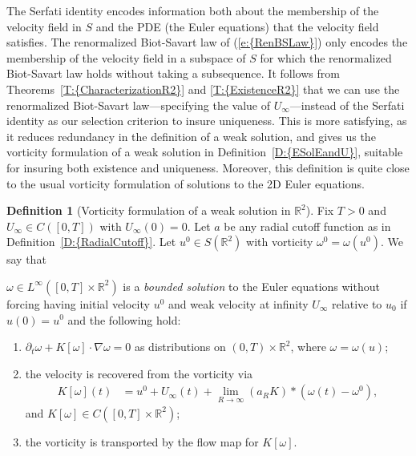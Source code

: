 \documentclass[reqno,openright,11pt,twoside]{amsart}
\theoremstyle{definition}
\newtheorem{definition}[theorem]{Definition}
\numberwithin{equation}{section}
\begin{document}
The Serfati identity encodes information both about the membership of the velocity field in $S$ and the PDE (the Euler equations) that the velocity field satisfies. The renormalized Biot-Savart law of {(\ref{e:{RenBSLaw}})} only encodes the membership of the velocity field in a subspace of $S$ for which the renormalized Biot-Savart law holds without taking a subsequence. It follows from {Theorems~\ref{T:{CharacterizationR2}} and \ref{T:{ExistenceR2}}} that we can use the renormalized Biot-Savart law---specifying the value of $U_{\ensuremath{\infty}}$---instead of the Serfati identity as our selection criterion to insure uniqueness. This is more satisfying, as it reduces redundancy in the definition of a weak solution, and gives us the vorticity formulation of a weak solution in {Definition~\ref{D:{ESolEandU}}}, suitable for insuring both existence and uniqueness. Moreover, this definition is quite close to the usual vorticity formulation of solutions to the 2D Euler equations.

\begin{definition}[Vorticity formulation of a weak solution in ${\ensuremath{{\ensuremath{\mathbb{{R}}}}}}^2$]\label{D:ESolEandU}
    Fix $T > 0$ and $U_{\ensuremath{\infty}} \in C([0, T])$ with $U_{\ensuremath{\infty}}(0) = 0$.
    Let $a$ be any radial cutoff function as in {Definition~\ref{D:{RadialCutoff}}}.
    Let $u^0 \in S({\ensuremath{{\ensuremath{\mathbb{{R}}}}}}^2)$ with vorticity
    $\omega^0 = \omega(u^0)$.
    We say that
    
    $\omega \in L^{\ensuremath{\infty}}([0, T] \times {\ensuremath{{\ensuremath{\mathbb{{R}}}}}}^2)$
    is a \textit{bounded solution} to the Euler equations
    without forcing having initial velocity $u^0$ and weak velocity at
    infinity $U_{\ensuremath{\infty}}$ relative to $u_0$
    if $u(0) = u^0$ and the following hold:
    \begin{enumerate}            
        \item
            ${\ensuremath{\partial}}_t \omega + K[\omega] \cdot {\ensuremath{\nabla}} \omega = 0$
            as distributions on $(0, T) \times {\ensuremath{{\ensuremath{\mathbb{{R}}}}}}^2$,
            where $\omega = \omega(u)$;
            
        \item
            the velocity is recovered from the vorticity via 
            \begin{align}\label{e:VortFormRecovery}
                K[\omega](t) &=  u^0  + U_{\ensuremath{\infty}}(t)
                + \lim_{R \to {\ensuremath{\infty}}} (a_R K) * (\omega(t) - \omega^0),
            \end{align}
            and $K[\omega] \in C([0, T] \times {\ensuremath{{\ensuremath{\mathbb{{R}}}}}}^2)$;

        \item
            the vorticity is transported by the flow map for $K[\omega]$.
            
    \end{enumerate}
\end{definition}
\end{document}
